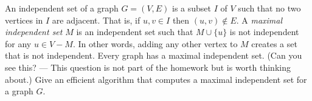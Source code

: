 An independent set of a graph $G = (V,E)$ is a subset $I$ of $V$ such
that no two vertices in $I$ are adjacent.  That is, if $u,v \in  I$ then
$(u,v) \not\in  E$.  A {\it maximal independent set} $M$ is an
independent set such that $M \cup  \{u\}$ is not independent for any $u
\in  V - M$.  In other words, adding any other vertex to $M$ creates a
set that is not independent.  Every graph has a maximal independent
set.  (Can you see this?  --- This question is not part of the homework
but is worth thinking about.) Give an efficient algorithm that computes
a maximal independent set for a graph $G$.
